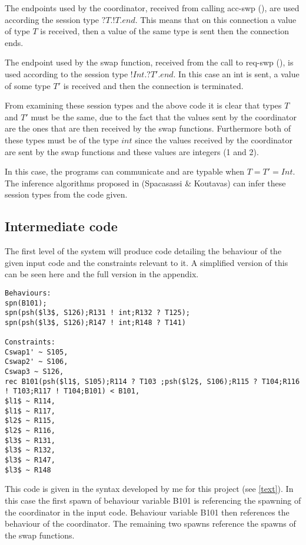 The endpoints used by the coordinator, received from calling acc-swp (), are used according the session type $?T.!T.end$. This means that on this connection a value of type $T$ is received, then a value of the same type is sent then the connection ends. 

The endpoint used by the swap function, received from the call to req-swp (), is used according to the session type $!Int.?T'.end$. In this case an int is sent, a value of some type $T'$ is received and then the connection is terminated. 

From examining these session types and the above code it is clear that types $T$ and $T'$ must be the same, due to the fact that the values sent by the coordinator are the ones that are then received by the swap functions. Furthermore both of these types must be of the type $int$ since the values received by the coordinator are sent by the swap functions and these values are integers (1 and 2).

In this case, the programs can communicate and are typable when $T=T'=Int$. The inference algorithms proposed in (Spacasassi \& Koutavas)\cite{paper1} can infer these session types from the code given. 

\subsection{Intermediate code}

The first level of the system will produce code detailing the behaviour of the given input code and the constraints relevant to it. A simplified version of this can be seen here and the full version in the appendix. 

\begin{lstlisting}
Behaviours:
spn(B101);
spn(psh($l3$, S126);R131 ! int;R132 ? T125);
spn(psh($l3$, S126);R147 ! int;R148 ? T141)

Constraints:
Cswap1' ~ S105,
Cswap2' ~ S106,
Cswap3 ~ S126,
rec B101(psh($l1$, S105);R114 ? T103 ;psh($l2$, S106);R115 ? T104;R116 ! T103;R117 ! T104;B101) < B101,
$l1$ ~ R114,
$l1$ ~ R117,
$l2$ ~ R115,
$l2$ ~ R116,
$l3$ ~ R131,
$l3$ ~ R132,
$l3$ ~ R147,
$l3$ ~ R148
\end{lstlisting}

This code is given in the syntax developed by me for this project (see \ref{text}). In this case the first spawn of behaviour variable B101 is referencing the spawning of the coordinator in the input code. Behaviour variable B101 then references the behaviour of the coordinator. The remaining two spawns reference the spawns of the swap functions.  

